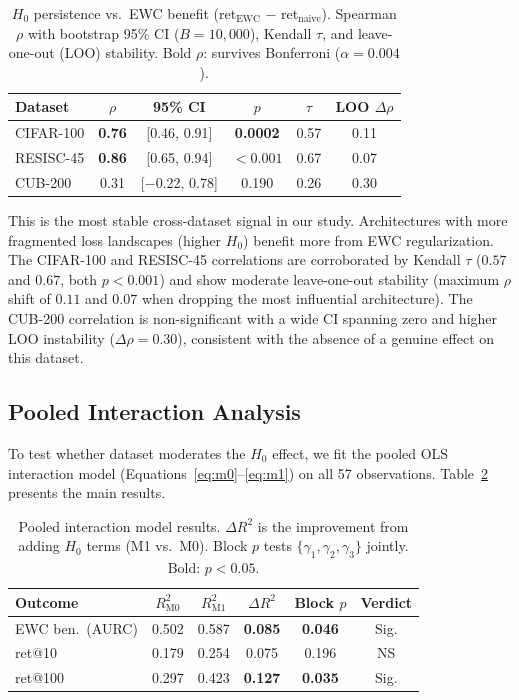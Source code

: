 \documentclass[10pt,twocolumn]{article}
\begin{document}
\begin{table}[t]
\centering
\caption{$H_0$ persistence vs.\ EWC benefit (ret$_{\text{EWC}}$ $-$ ret$_{\text{naive}}$). Spearman $\rho$ with bootstrap 95\% CI ($B = 10{,}000$), Kendall $\tau$, and leave-one-out (LOO) stability. Bold $\rho$: survives Bonferroni ($\alpha = 0.004$).}
\label{tab:ewc_corr}
\small
\setlength{\tabcolsep}{2.5pt}
\begin{tabular}{@{}lccccc@{}}
\toprule
Dataset & $\rho$ & 95\% CI & $p$ & $\tau$ & LOO $\Delta\rho$ \\
\midrule
CIFAR-100  & \textbf{0.76} & [0.46, 0.91] & \textbf{0.0002} & 0.57 & 0.11 \\
RESISC-45  & \textbf{0.86} & [0.65, 0.94] & $\mathbf{< 0.001}$ & 0.67 & 0.07 \\
CUB-200    & 0.31 & [$-$0.22, 0.78] & 0.190 & 0.26 & 0.30 \\
\bottomrule
\end{tabular}
\end{table}

This is the most stable cross-dataset signal in our study. Architectures with more fragmented loss landscapes (higher $H_0$) benefit more from EWC regularization. The CIFAR-100 and RESISC-45 correlations are corroborated by Kendall $\tau$ ($0.57$ and $0.67$, both $p < 0.001$) and show moderate leave-one-out stability (maximum $\rho$ shift of $0.11$ and $0.07$ when dropping the most influential architecture). The CUB-200 correlation is non-significant with a wide CI spanning zero and higher LOO instability ($\Delta\rho = 0.30$), consistent with the absence of a genuine effect on this dataset.

\subsection{Pooled Interaction Analysis}
\label{sec:pooled}

To test whether dataset moderates the $H_0$ effect, we fit the pooled OLS interaction model (Equations~\ref{eq:m0}--\ref{eq:m1}) on all 57 observations. Table~\ref{tab:pooled} presents the main results.

\begin{table}[t]
\centering
\caption{Pooled interaction model results. $\Delta R^2$ is the improvement from adding $H_0$ terms (M1 vs.\ M0). Block $p$ tests $\{\gamma_1, \gamma_2, \gamma_3\}$ jointly. Bold: $p < 0.05$.}
\label{tab:pooled}
\small
\setlength{\tabcolsep}{2pt}
\begin{tabular}{@{}lccccc@{}}
\toprule
Outcome & $R^2_{\text{M0}}$ & $R^2_{\text{M1}}$ & $\Delta R^2$ & Block $p$ & Verdict \\
\midrule
EWC ben.\ (AURC) & 0.502 & 0.587 & \textbf{0.085} & \textbf{0.046} & Sig. \\
ret@10 & 0.179 & 0.254 & 0.075 & 0.196 & NS \\
ret@100 & 0.297 & 0.423 & \textbf{0.127} & \textbf{0.035} & Sig. \\
\bottomrule
\end{tabular}
\end{table}
\end{document}
